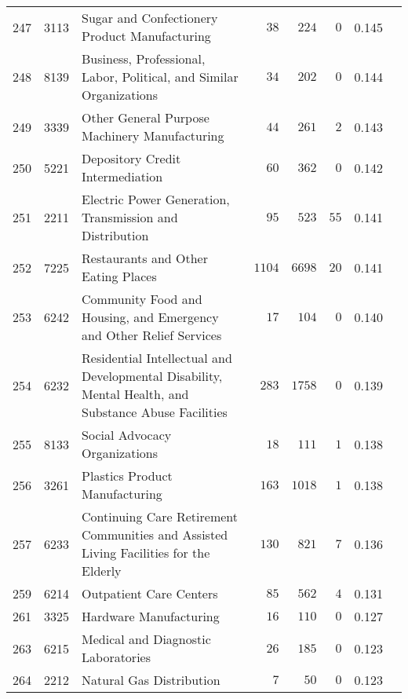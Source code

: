\documentclass[9pt, oneside]{article}   	%
\begin{document}
\begin{longtable}{lcp{3 in}ccccc}
247  & 3113 & Sugar and Confectionery Product Manufacturing & $\phantom{00}38$ & $\phantom{0}224$ & $\phantom{0}0$ & 0.145 \\
248  & 8139 & Business, Professional, Labor, Political, and Similar Organizations & $\phantom{00}34$ & $\phantom{0}202$ & $\phantom{0}0$ & 0.144 \\
249  & 3339 & Other General Purpose Machinery Manufacturing & $\phantom{00}44$ & $\phantom{0}261$ & $\phantom{0}2$ & 0.143 \\
250  & 5221 & Depository Credit Intermediation & $\phantom{00}60$ & $\phantom{0}362$ & $\phantom{0}0$ & 0.142 \\
251  & 2211 & Electric Power Generation, Transmission and Distribution & $\phantom{00}95$ & $\phantom{0}523$ & $55$ & 0.141 \\
252  & 7225 & Restaurants and Other Eating Places & $1104$ & $6698$ & $20$ & 0.141 \\
253  & 6242 & Community Food and Housing, and Emergency and Other Relief Services & $\phantom{00}17$ & $\phantom{0}104$ & $\phantom{0}0$ & 0.140 \\
254  & 6232 & Residential Intellectual and Developmental Disability, Mental Health, and Substance Abuse Facilities & $\phantom{0}283$ & $1758$ & $\phantom{0}0$ & 0.139 \\
255  & 8133 & Social Advocacy Organizations & $\phantom{00}18$ & $\phantom{0}111$ & $\phantom{0}1$ & 0.138 \\
256  & 3261 & Plastics Product Manufacturing & $\phantom{0}163$ & $1018$ & $\phantom{0}1$ & 0.138 \\
257  & 6233 & Continuing Care Retirement Communities and Assisted Living Facilities for the Elderly & $\phantom{0}130$ & $\phantom{0}821$ & $\phantom{0}7$ & 0.136 \\

259  & 6214 & Outpatient Care Centers & $\phantom{00}85$ & $\phantom{0}562$ & $\phantom{0}4$ & 0.131 \\
261  & 3325 & Hardware Manufacturing & $\phantom{00}16$ & $\phantom{0}110$ & $\phantom{0}0$ & 0.127 \\

263  & 6215 & Medical and Diagnostic Laboratories & $\phantom{00}26$ & $\phantom{0}185$ & $\phantom{0}0$ & 0.123 \\
264  & 2212 & Natural Gas Distribution & $\phantom{000}7$ & $\phantom{00}50$ & $\phantom{0}0$ & 0.123 \\


\end{longtable}
\end{document}
